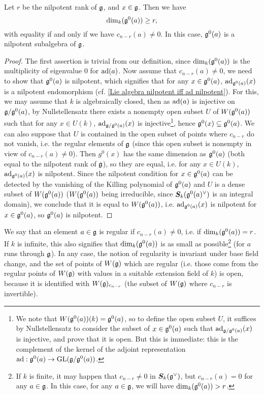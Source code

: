 \begin{proposition}\label{scheme group Lie algebra g^0(a) regular iff c_n-r}
Let $r$ be the nilpotent rank of $\mathfrak{g}$, and $x\in\mathfrak{g}$. Then we have
\[\dim_k(\mathfrak{g}^0(a))\geq r,\]
with equality if and only if we have $c_{n-r}(a)\neq 0$. In this case, $\mathfrak{g}^0(a)$ is a nilpotent subalgebra of $\mathfrak{g}$.
\end{proposition}
\begin{proof}
The first assertion is trivial from our definition, since $\dim_k(\mathfrak{g}^0(a))$ is the multiplicity of eigenvalue $0$ for $\mathrm{ad}(a)$. Now assume that $c_{n-r}(a)\neq 0$, we need to show that $\mathfrak{g}^0(a)$ is nilpotent, which signifies that for any $x\in\mathfrak{g}^0(a)$, $\mathrm{ad}_{\mathfrak{g}^0(a)}(x)$ is a nilpotent endomorphism (cf. \cref{Lie algebra nilpotent iff ad nilpotent}). For this, we may assume that $k$ is algebraically closed, then as $\mathrm{ad}(a)$ is injective on $\mathfrak{g}/\mathfrak{g}^0(a)$, by Nullstellensatz there exists a nonempty open subset $U$ of $W(\mathfrak{g}^0(a))$ such that for any $x\in U(k)$, $\mathrm{ad}_{\mathfrak{g}/\mathfrak{g}^0(a)}(x)$ is injective\footnote{We note that $W(\mathfrak{g}^0(a))(k)=\mathfrak{g}^0(a)$, so to define the open subset $U$, it suffices by Nullstellensatz to consider the subset of $x\in\mathfrak{g}^0(a)$ such that $\mathrm{ad}_{\mathfrak{g}/\mathfrak{g}^0(a)}(x)$ is injective, and prove that it is open. But this is immediate: this is the complement of the kernel of the adjoint representation $\mathrm{ad}:\mathfrak{g}^0(a)\to\mathrm{GL}(\mathfrak{g}/\mathfrak{g}^0(a))$.}, hence $\mathfrak{g}^0(x)\subseteq\mathfrak{g}^0(a)$. We can also suppose that $U$ is contained in the open subset of points where $c_{n-r}$ do not vanish, i.e. the regular elements of $\mathfrak{g}$ (since this open subset is nonempty in view of $c_{n-r}(a)\neq 0$). Then $g^0(x)$ has the same dimension as $\mathfrak{g}^0(a)$ (both equal to the nilpotent rank of $\mathfrak{g}$), so they are equal, i.e. for any $x\in U(k)$, $\mathrm{ad}_{\mathfrak{g}^0(a)}(x)$ is nilpotent. Since the nilpotent condition for $x\in\mathfrak{g}^0(a)$ can be detected by the vanishing of the Killing polynomial of $\mathfrak{g}^0(a)$ and $U$ is a dense subset of $W(\mathfrak{g}^0(a))$ ($W(\mathfrak{g}^0(a))$ being irreducible, since $\bm{S}_k(\mathfrak{g}^0(a)^\vee)$ is an integral domain), we conclude that it is equal to $W(\mathfrak{g}^0(a))$, i.e. $\mathrm{ad}_{\mathfrak{g}^0(a)}(x)$ is nilpotent for $x\in\mathfrak{g}^0(a)$, so $\mathfrak{g}^0(a)$ is nilpotent.
\end{proof}

We say that an element $a\in\mathfrak{g}$ is regular if $c_{n-r}(a)\neq 0$, i.e. if $\dim_k(\mathfrak{g}^0(a))=r$. If $k$ is infinite, this also signifies that $\dim_k(\mathfrak{g}^0(a))$ is as small as possible\footnote{If $k$ is finite, it may happen that $c_{n-r}\neq 0$ in $\bm{S}_k(\mathfrak{g}^\vee)$, but $c_{n-r}(a)=0$ for any $a\in\mathfrak{g}$. In this case, for any $a\in\mathfrak{g}$, we will have $\dim_k(\mathfrak{g}^0(a))>r$.} (for $a$ runs through $\mathfrak{g}$). In any case, the notion of regularity is invariant under base field change, and the set of points of $W(\mathfrak{g})$ which are regular (i.e. those come from the regular points of $W(\mathfrak{g})$ with values in a suitable extension field of $k$) is open, because it is identified with $W(\mathfrak{g})_{c_{n-r}}$ (the subset of $W(\mathfrak{g})$ where $c_{n-r}$ is invertible). 

